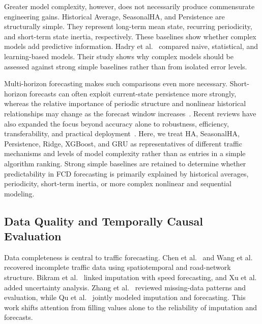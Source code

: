 \documentclass[pdflatex,sn-mathphys-num,iicol]{sn-jnl}
\begin{document}
Greater model complexity, however, does not necessarily produce commensurate engineering gains. Historical Average, SeasonalHA, and Persistence are structurally simple. They represent long-term mean state, recurring periodicity, and short-term state inertia, respectively. These baselines show whether complex models add predictive information. Hadry et al.~\cite{Hadry2025TrafficForecasting} compared naive, statistical, and learning-based models. Their study shows why complex models should be assessed against strong simple baselines rather than from isolated error levels.

Multi-horizon forecasting makes such comparisons even more necessary. Short-horizon forecasts can often exploit current-state persistence more strongly, whereas the relative importance of periodic structure and nonlinear historical relationships may change as the forecast window increases~\cite{Hadry2025TrafficForecasting,Zeb2024FeatureProjection}. Recent reviews have also expanded the focus beyond accuracy alone to robustness, efficiency, transferability, and practical deployment~\cite{Du2025TrafficSurvey,Khatiriolyaee2026TrafficPrediction,Liu2026DeepLearningReview}. Here, we treat HA, SeasonalHA, Persistence, Ridge, XGBoost, and GRU as representatives of different traffic mechanisms and levels of model complexity rather than as entries in a simple algorithm ranking. Strong simple baselines are retained to determine whether predictability in FCD forecasting is primarily explained by historical averages, periodicity, short-term inertia, or more complex nonlinear and sequential modeling.



\subsection{Data Quality and Temporally Causal Evaluation}
\label{subsec:data-quality-causality}

Data completeness is central to traffic forecasting. Chen et al.~\cite{Chen2024TrafficCompletion} and Wang et al.~\cite{Wang2024RoadNetworkPixelization} recovered incomplete traffic data using spatiotemporal and road-network structure. Bikram et al.~\cite{Bikram2024Imputation} linked imputation with speed forecasting, and Xu et al.~\cite{Xu2023AGNP} added uncertainty analysis. Zhang et al.~\cite{Zhang2024MissingData} reviewed missing-data patterns and evaluation, while Qu et al.~\cite{Qu2024TrafficPredictionImputation} jointly modeled imputation and forecasting. This work shifts attention from filling values alone to the reliability of imputation and forecasts.
\end{document}
